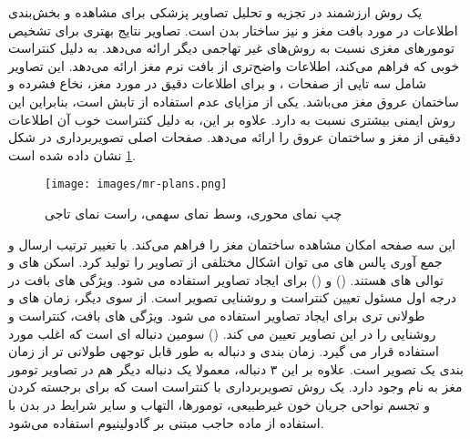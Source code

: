  یک روش ارزشمند در تجزیه و تحلیل تصاویر پزشکی برای مشاهده و بخش‌بندی اطلاعات در مورد بافت مغز و نیز ساختار بدن است. تصاویر  نتایج بهتری برای تشخیص تومورهای مغزی نسبت به روش‌های غیر تهاجمی دیگر ارائه می‌دهد.  به دلیل کنتراست خوبی که فراهم می‌کند، اطلاعات واضح‌تری از بافت نرم مغز ارائه می‌دهد. این تصاویر شامل سه تایی از صفحات ،  و  برای اطلاعات دقیق در مورد مغز، نخاع فشرده و ساختمان عروق مغز می‌باشد. یکی از مزایای  عدم استفاده از تابش است، بنابراین این روش ایمنی بیشتری نسبت به  دارد. علاوه بر این،  به دلیل کنتراست خوب آن اطلاعات دقیقی از مغز و ساختمان عروق را ارائه می‌دهد. صفحات اصلی تصویربرداری   در شکل \ref{fig:mr-plans} نشان داده شده است.
\\
\begin{figure}[ht]
\centerline{\texttt{[image: images/mr-plans.png]}}
\caption[سه صفحه  مغز]{چپ نمای محوری، وسط نمای سهمی، راست نمای تاجی\cite{soomro2022image}}
\label{fig:mr-plans}
\end{figure}
این سه صفحه امکان مشاهده ساختمان مغز را فراهم می‌کند.
با تغییر ترتیب ارسال و جمع آوری پالس های  می توان اشکال مختلفی از تصاویر را تولید کرد. اسکن های  و  توالی های  هستند. () و  () برای ایجاد تصاویر  استفاده می شود. ویژگی های  بافت در درجه اول مسئول تعیین کنتراست و روشنایی تصویر است. از سوی دیگر، زمان های  و  طولانی تری برای ایجاد تصاویر  استفاده می شود. ویژگی های  بافت، کنتراست و روشنایی را در این تصاویر تعیین می کند. () سومین دنباله ای است که اغلب مورد استفاده قرار می گیرد. زمان بندی  و  دنباله  به طور قابل توجهی طولانی تر از زمان بندی یک تصویر  است. علاوه بر این ۳ دنباله، معمولا یک دنباله دیگر هم در تصاویر  تومور مغز به نام  وجود دارد.  یک روش تصویربرداری با کنتراست است که برای برجسته کردن و تجسم نواحی جریان خون غیرطبیعی، تومورها، التهاب و سایر شرایط در بدن با استفاده از ماده حاجب مبتنی بر گادولینیوم استفاده می‌شود\cite{ranjbarzadeh}.
